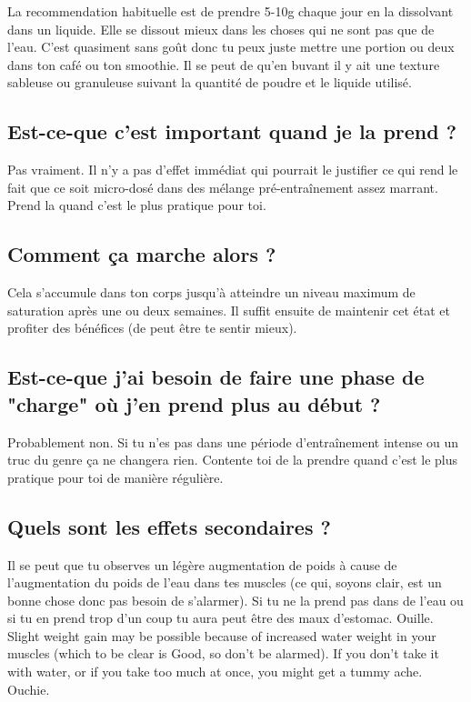 \documentclass{article}
\begin{document}
La recommendation habituelle est de prendre 5-10g chaque jour en la dissolvant dans un liquide. Elle se dissout mieux dans les choses qui ne sont pas que de l'eau. C'est quasiment sans goût donc tu peux juste mettre une portion ou deux dans ton café ou ton smoothie. Il se peut de qu'en buvant il y ait une texture sableuse ou granuleuse suivant la quantité de poudre et le liquide utilisé. 

\subsection{Est-ce-que c'est important quand je la prend ?}

Pas vraiment. Il n'y a pas d'effet immédiat qui pourrait le justifier ce qui rend le fait que ce soit micro-dosé dans des mélange pré-entraînement assez marrant. Prend la quand c'est le plus pratique pour toi.

\subsection{Comment ça marche alors ?}

Cela s'accumule dans ton corps jusqu'à atteindre un niveau maximum de saturation après une ou deux semaines. Il suffit ensuite de maintenir cet état et profiter des bénéfices (de peut être te sentir mieux).

\subsection{Est-ce-que j'ai besoin de faire une phase de "charge" où j'en prend plus au début ?}

Probablement non. Si tu n'es pas dans une période d'entraînement intense ou un truc du genre ça ne changera rien. Contente toi de la prendre quand c'est le plus pratique pour toi de manière régulière.

\subsection{Quels sont les effets secondaires ?}

Il se peut que tu observes un légère augmentation de poids à cause de l'augmentation du poids de l'eau dans tes muscles (ce qui, soyons clair, est un bonne chose donc pas besoin de s'alarmer). Si tu ne la prend pas dans de l'eau ou si tu en prend trop d'un coup tu aura peut être des maux d'estomac. Ouille.
Slight weight gain may be possible because of increased water weight in your muscles (which to be clear is Good, so don't be alarmed). If you don’t take it with water, or if you take too much at once, you might get a tummy ache. Ouchie.
\end{document}

